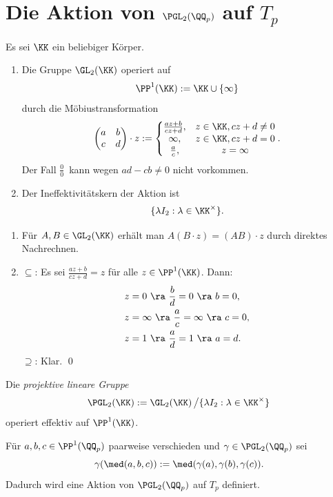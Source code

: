 \section{Die Aktion von $\PGL_2(\QQ_p)$ auf $T_p$}\label{sec_PGL}

\BEM Es sei $\KK$ ein beliebiger Körper.
\begin{enumerate}
\item Die Gruppe $\GL_2(\KK)$ operiert auf
\[
\PP^1(\KK) := \KK \cup \{\infty\}
\]
durch die Möbiustransformation
\[
\begin{pmatrix}
a & b \\
c & d
\end{pmatrix}\cdot z
:=
\left\{
\begin{matrix}
\frac{az+b}{cz+d}, & z\in\KK, cz+d\neq 0 \\
\infty, & z\in\KK, cz+d = 0 \\
\frac{a}{c}, & z=\infty
\end{matrix}
\right..
\]
Der Fall \glqq$\frac{0}{0}$\grqq\ kann wegen $ad-cb\neq 0$ nicht
vorkommen.
\item Der Ineffektivitätskern der Aktion ist
\[
\{ \lambda I_2 : \lambda\in\KK^\times \}.
\]
\end{enumerate}
\bew \begin{enumerate}
\item Für $A,B\in\GL_2(\KK)$ erhält man $A(B\cdot z)=(AB)\cdot z$
durch direktes Nachrechnen.
\item
\glqq$\subseteq$\grqq:
Es sei $\frac{az+b}{cz+d} = z$ für alle $z\in\PP^1(\KK)$.
Dann:
\begin{align*}
&z=0\ \ra\ \frac{b}{d}=0\ \ra\ b=0, \\
&z=\infty\ \ra\ \frac{a}{c}=\infty\ \ra\ c=0, \\
&z=1\ \ra\ \frac{a}{d}=1\ \ra\ a=d.
\end{align*}
\glqq$\supseteq$\grqq: Klar.
\qed
\end{enumerate}

\FOLG Die \emph{projektive lineare Gruppe}
\[
\PGL_2(\KK) := \GL_2(\KK)\left/\{ \lambda I_2 : \lambda\in\KK^\times\}\right.
\]
operiert effektiv auf $\PP^1(\KK)$.

\PROP Für $a,b,c\in\PP^1(\QQ_p)$ paarweise verschieden und
$\gamma\in\PGL_2(\QQ_p)$ sei
\[
\gamma(\med(a,b,c)) := \med(\gamma(a),\gamma(b),\gamma(c)).
\]
Dadurch wird eine Aktion von $\PGL_2(\QQ_p)$ auf $T_p$ definiert.


